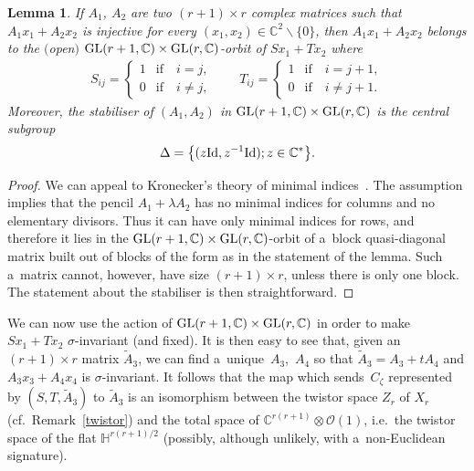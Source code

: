\documentclass[pdftex]{sigma}
\numberwithin{equation}{section}
\newtheorem{Lemma}[Theorem]{Lemma}
\begin{document}
\begin{Lemma}
If $A_1$, $A_2$ are two $(r+1)\times r$ complex matrices such that $ A_1x_1+A_2x_2$ is injective for every $(x_1,x_2)\in
{\mathbb C}^2\backslash\{0\}$, then $ A_1x_1+A_2x_2$ belongs to the $($open$)$ ${\rm GL}(r+1,{\mathbb C})\times {\rm GL}(r,{\mathbb
C})$-orbit of $ Sx_1 +Tx_2$ where
\begin{gather*}
S_{ij}=
\begin{cases}
1 & \text{if}\quad i=j,
\\
0 & \text{if}\quad i\neq j,
\end{cases}
\qquad
T_{ij}=
\begin{cases}
1 & \text{if}\quad i=j+1,
\\
0 & \text{if}\quad i\neq j+1.
\end{cases}
\end{gather*}
Moreover, the stabiliser of $(A_1,A_2)$ in ${\rm GL}(r+1,{\mathbb C})\times {\rm GL}(r,{\mathbb C})$ is the central subgroup
\begin{gather*}
\Delta=\big\{(z{\rm Id},z^{-1}{\rm Id}); z\in {\mathbb C}^\ast\big\}.
\end{gather*}
\end{Lemma}

\begin{proof}
We can appeal to Kronecker's theory of minimal indices~\cite[Chapter~XII]{Grant}.
The assumption implies that the pencil $A_1+\lambda A_2$ has no minimal indices for columns and no elementary divisors.
Thus it can have only minimal indices for rows, and therefore it lies in the ${\rm GL}(r+1,{\mathbb C})\times {\rm GL}(r,{\mathbb
C})$-orbit of a~block quasi-diagonal matrix built out of blocks of the form as in the statement of the lemma.
Such a~matrix cannot, however, have size $(r+1)\times r$, unless there is only one block.
The statement about the stabiliser is then straightforward.
\end{proof}

We can now use the action of ${\rm GL}(r+1,{\mathbb C})\times {\rm GL}(r,{\mathbb C})$ in order to make $Sx_1+Tx_2$
$\sigma$-invariant (and f\/ixed).
It is then easy to see that, given an $(r+1)\times r$ matrix $\tilde A_3$, we can f\/ind a~unique~$A_3$,~$A_4$ so that
$\tilde A_3=A_3+tA_4$ and $A_3x_3+A_4x_4$ is $\sigma$-invariant.
It follows that the map which sends~$C_\zeta$ represented by $(S,T,\tilde A_3)$ to $\tilde A_3$ is an isomorphism
between the twistor space $Z_r$ of $X_r$ (cf.\
Remark~\ref{twistor}) and the total space of ${\mathbb C}^{r(r+1)}\otimes {\mathcal{O}}(1)$, i.e.\
the twistor space of the f\/lat ${\mathbb{H}}^{r(r+1)/2}$ (possibly, although unlikely, with a~non-Euclidean signature).
\end{document}
